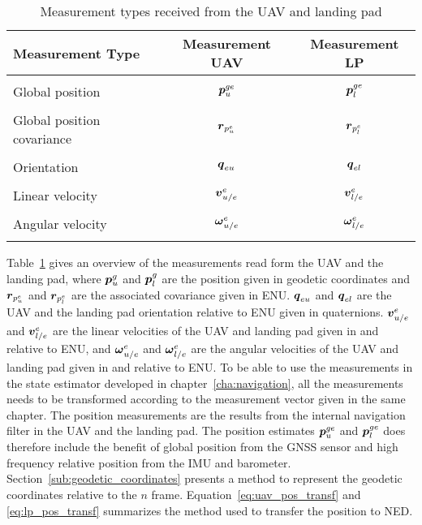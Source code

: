 \begin{table}[ht]
\centering 
  \begin{tabular}{l c c}
    \toprule
    \textbf{Measurement Type}&\textbf{Measurement UAV}&\textbf{Measurement LP} \\\hline \\[-1em]
    Global position&$\boldsymbol{p}^{ge}_{u}$&$\boldsymbol{p}^{ge}_{l}$\\ \\[-1em]
    Global position covariance&$\boldsymbol{r}_{p_u^{e}}$&$\boldsymbol{r}_{p_l^{e}}$\\ \\[-1em]
    Orientation&$\boldsymbol{q}_{eu}$&$\boldsymbol{q}_{el}$\\ \\[-1em]
    Linear velocity&$\boldsymbol{v}^e_{u/e}$&$\boldsymbol{v}^e_{l/e}$\\ \\[-1em]
    Angular velocity&$\boldsymbol{\omega}^e_{u/e}$&$\boldsymbol{\omega}^e_{l/e}$\\ \\[-1em]
    \bottomrule
  \end{tabular}
  \caption{Measurement types received from the UAV and landing pad}
  \label{tab:measurementOverview} 
\end{table}
Table~\ref{tab:measurementOverview} gives an overview of the measurements read form the UAV and the landing pad, where $\boldsymbol{p}^g_u$ and $\boldsymbol{p}^g_l$ are the position given in geodetic coordinates and $\boldsymbol{r}_{p_u^{e}}$ and $\boldsymbol{r}_{p_l^{e}}$ are the associated covariance given in ENU. $\boldsymbol{q}_{eu}$ and $\boldsymbol{q}_{el}$ are the UAV and the landing pad orientation relative to ENU given in quaternions. $\boldsymbol{v}^e_{u/e}$ and $\boldsymbol{v}^e_{l/e}$ are the linear velocities of the \gls{UAV} and landing pad given in and relative to ENU, and $\boldsymbol{\omega}^e_{u/e}$ and $\boldsymbol{\omega}^e_{l/e}$ are the angular velocities of the \gls{UAV} and landing pad given in and relative to ENU. To be able to use the measurements in the state estimator developed in chapter~\ref{cha:navigation}, all the measurements needs to be transformed according to the measurement vector given in the same chapter. The position measurements are the results from the internal navigation filter in the UAV and the landing pad. The position estimates $\boldsymbol{p}^{ge}_{u}$ and $\boldsymbol{p}^{ge}_{l}$ does therefore include the benefit of global position from the GNSS sensor and high frequency relative position from the IMU and barometer. Section~\ref{sub:geodetic_coordinates} presents a method to represent the geodetic coordinates relative to the $n$ frame. Equation~\ref{eq:uav_pos_transf} and \ref{eq:lp_pos_transf} summarizes the method used to transfer the position to NED.

